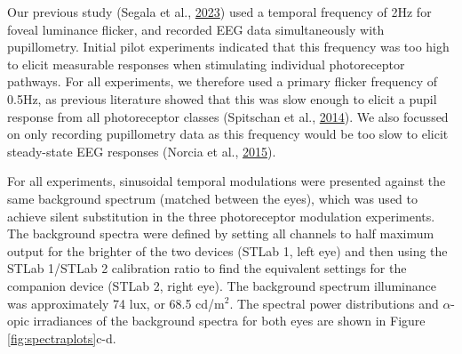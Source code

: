 \documentclass[
]{article}
\begin{document}
Our previous study (Segala et al., \protect\hyperlink{ref-Segala2023}{2023}) used a temporal frequency of 2Hz for foveal luminance flicker, and recorded EEG data simultaneously with pupillometry. Initial pilot experiments indicated that this frequency was too high to elicit measurable responses when stimulating individual photoreceptor pathways. For all experiments, we therefore used a primary flicker frequency of 0.5Hz, as previous literature showed that this was slow enough to elicit a pupil response from all photoreceptor classes (Spitschan et al., \protect\hyperlink{ref-Spitschan2014}{2014}). We also focussed on only recording pupillometry data as this frequency would be too slow to elicit steady-state EEG responses (Norcia et al., \protect\hyperlink{ref-Norcia2015}{2015}).

For all experiments, sinusoidal temporal modulations were presented against the same background spectrum (matched between the eyes), which was used to achieve silent substitution in the three photoreceptor modulation experiments. The background spectra were defined by setting all channels to half maximum output for the brighter of the two devices (STLab 1, left eye) and then using the STLab 1/STLab 2 calibration ratio to find the equivalent settings for the companion device (STLab 2, right eye). The background spectrum illuminance was approximately 74 lux, or 68.5 cd/m\(^2\). The spectral power distributions and \(\alpha\)-opic irradiances of the background spectra for both eyes are shown in Figure \ref{fig:spectraplots}c-d.
\end{document}
